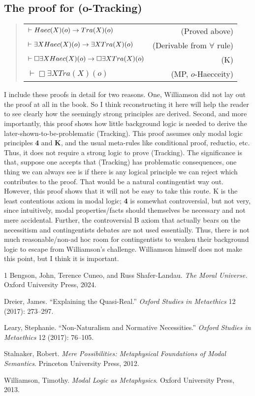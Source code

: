 \subsection{The proof for (o-Tracking)} 
\begin{quote}
\begin{tabulary}{\textwidth}{Lr}
$\vdash Haec(X)(o) \rightarrow Tra(X)(o)$ & (Proved above) \\
$\vdash \exists X Haec(X)(o) \rightarrow \exists X Tra(X)(o)$ & (Derivable from $\forall$ rule) \\
$\vdash \Box \exists X Haec(X)(o) \rightarrow \Box \exists X Tra(X)(o)$ & (K)\\
$\vdash \Box \exists X Tra(X)(o)$ & (MP, $o$-Haecceity) 
\end{tabulary}
\end{quote}


\noindent I include these proofs in detail for two reasons. One, Williamson did not lay out the proof at all in the book. So I think reconstructing it here will help the reader to see clearly how the seemingly strong principles are derived. Second, and more importantly, this proof shows how little background logic is needed to derive the later-shown-to-be-problematic (Tracking). This proof assumes only modal logic principles \textbf{4} and \textbf{K}, and the usual meta-rules like conditional proof, reductio, etc. Thus, it  does not require a strong logic to prove (Tracking). The significance is that, suppose one accepts that (Tracking) has problematic consequences, one thing we can always see is if there is any logical principle we can reject which contributes to the proof. That would be a natural contingentist way out. However, this proof shows that it will not be easy to take this route. K is the least contentious axiom in modal logic; \textbf{4} is somewhat controversial, but not very, since intuitively, modal properties/facts should themselves be necessary and not mere accidental. Further, the controversial B axiom that actually bears on the necessitism and contingentists debates are not used essentially. Thus, there is not much reasonable/non-ad hoc room for contingentists to weaken their background logic to escape from Williamson's challenge. Williamson himself does not make this point, but I think it is important. 


\begin{hangparas}{\hangingindent}{1}
  Bengson, John, Terence Cuneo, and Russ Shafer-Landau. \textit{The Moral Universe.} Oxford University Press, 2024.

  Dreier, James. ``Explaining the Quasi-Real.'' \textit{Oxford Studies in Metaethics} 12 (2017): 273--297.

  Leary, Stephanie. ``Non-Naturalism and Normative Necessities.'' \textit{Oxford Studies in Metaethics} 12 (2017): 76--105.

  Stalnaker, Robert. \textit{Mere Possibilities: Metaphysical Foundations of Modal Semantics}. Princeton University Press, 2012.

  Williamson, Timothy. \textit{Modal Logic as Metaphysics}. Oxford University Press, 2013.
  \end{hangparas}
